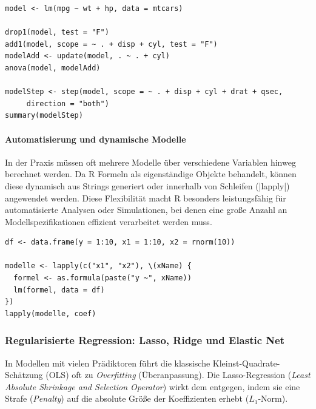 \documentclass[10pt,twocolumn]{scrartcl}
\renewcommand{\lstinline}{\mycoloredinline}
\begin{document}
\begin{lstlisting}
model <- lm(mpg ~ wt + hp, data = mtcars)

drop1(model, test = "F")
add1(model, scope = ~ . + disp + cyl, test = "F")
modelAdd <- update(model, . ~ . + cyl)
anova(model, modelAdd)

modelStep <- step(model, scope = ~ . + disp + cyl + drat + qsec,
     direction = "both")
summary(modelStep)
\end{lstlisting}

\paragraph{Automatisierung und dynamische Modelle}

In der Praxis müssen oft mehrere Modelle über verschiedene Variablen hinweg berechnet werden. Da R Formeln als eigenständige Objekte behandelt, können diese dynamisch aus Strings generiert oder innerhalb von Schleifen (\lstinline|lapply|) angewendet werden. Diese Flexibilität macht R besonders leistungsfähig für automatisierte Analysen oder Simulationen, bei denen eine große Anzahl an Modellspezifikationen effizient verarbeitet werden muss.

\begin{lstlisting}
df <- data.frame(y = 1:10, x1 = 1:10, x2 = rnorm(10))

modelle <- lapply(c("x1", "x2"), \(xName) {
  formel <- as.formula(paste("y ~", xName))
  lm(formel, data = df)
})
lapply(modelle, coef)
\end{lstlisting}


\subsubsection{Regularisierte Regression: Lasso, Ridge und Elastic Net}

In Modellen mit vielen Prädiktoren führt die klassische Kleinst-Quadrate-Schätzung (OLS) oft zu \emph{Overfitting} (Überanpassung). Die Lasso-Regression (\textit{Least Absolute Shrinkage and Selection Operator}) wirkt dem entgegen, indem sie eine Strafe (\emph{Penalty}) auf die absolute Größe der Koeffizienten erhebt ($L_1$-Norm).
\end{document}
